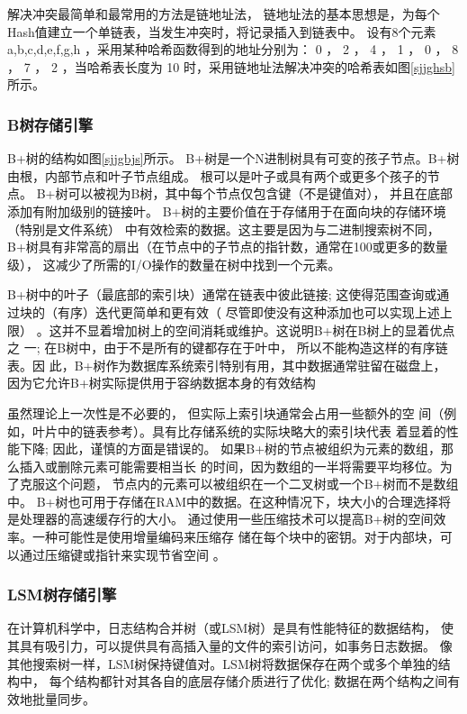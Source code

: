 解决冲突最简单和最常用的方法是链地址法，
链地址法的基本思想是，为每个Hash值建立一个单链表，当发生冲突时，将记录插入到链表中。
设有$  8  $个元素 { a,b,c,d,e,f,g,h } ，采用某种哈希函数得到的地址分别为：
 {0 ， 2 ， 4 ， 1 ， 0 ， 8 ， 7 ， 2} 
 ，当哈希表长度为 10 时，采用链地址法解决冲突的哈希表如图\ref{sjjghsb}所示。
\subsubsection{B树存储引擎}
B+树的结构如图\ref{sjjgbjs}所示。
B+树是一个N进制树具有可变的孩子节点。B+树由根，内部节点和叶子节点组成。
根可以是叶子或具有两个或更多个孩子的节点。
B+树可以被视为B树，其中每个节点仅包含键（不是键值对），
并且在底部添加有附加级别的链接叶。
B+树的主要价值在于存储用于在面向块的存储环境（特别是文件系统）
中有效检索的数据。这主要是因为与二进制搜索树不同，
B+树具有非常高的扇出（在节点中的子节点的指针数，通常在100或更多的数量级），
这减少了所需的I/O操作的数量在树中找到一个元素。

B+树中的叶子（最底部的索引块）通常在链表中彼此链接;
这使得范围查询或通过块的（有序）迭代更简单和更有效（
 尽管即使没有这种添加也可以实现上述上限）
 。这并不显着增加树上的空间消耗或维护。这说明B+树在B树上的显着优点之
 一; 在B树中，由于不是所有的键都存在于叶中，
 所以不能构造这样的有序链表。因
 此，B+树作为数据库系统索引特别有用，其中数据通常驻留在磁盘上，
 因为它允许B+树实际提供用于容纳数据本身的有效结构
 
 虽然理论上一次性是不必要的，
但实际上索引块通常会占用一些额外的空
间（例如，叶片中的链表参考）。具有比存储系统的实际块略大的索引块代表
着显着的性能下降; 因此，谨慎的方面是错误的。
如果B+树的节点被组织为元素的数组，那么插入或删除元素可能需要相当长
的时间，因为数组的一半将需要平均移位。为了克服这个问题，
节点内的元素可以被组织在一个二叉树或一个B+树而不是数组中。
B+树也可用于存储在RAM中的数据。在这种情况下，块大小的合理选择将
是处理器的高速缓存行的大小。
通过使用一些压缩技术可以提高B+树的空间效率。一种可能性是使用增量编码来压缩存
储在每个块中的密钥。对于内部块，可以通过压缩键或指针来实现节省空间
。
\subsubsection{LSM树存储引擎}
在计算机科学中，日志结构合并树（或LSM树）是具有性能特征的数据结构，
使其具有吸引力，可以提供具有高插入量的文件的索引访问，如事务日志数据。
像其他搜索树一样，LSM树保持键值对。LSM树将数据保存在两个或多个单独的结构中，
每个结构都针对其各自的底层存储介质进行了优化; 数据在两个结构之间有效地批量同步。
